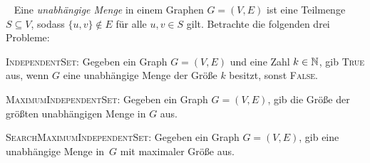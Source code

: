 \documentclass{uebung_cs}
\begin{document}
\begin{exercise}\
	Eine \emph{unabhängige Menge} in einem Graphen $G = (V,E)$ ist eine Teilmenge $S \subseteq V$, sodass $\{u,v\} \not\in E$ für alle $u,v \in S$ gilt. Betrachte die folgenden drei Probleme:

	\textsc{IndependentSet}: Gegeben ein Graph $G = (V,E)$ und eine Zahl $k \in \mathbb{N}$, gib \textsc{True} aus, wenn $G$ eine unabhängige Menge der Größe $k$ besitzt, sonst \textsc{False}.

	\textsc{MaximumIndependentSet}: Gegeben ein Graph $G = (V,E)$, gib die Größe der größten unabhängigen Menge in $G$ aus.

	\textsc{SearchMaximumIndependentSet}: Gegeben ein Graph $G = (V,E)$, gib eine unabhängige Menge in~$G$ mit maximaler Größe aus.


\end{exercise}
\end{document}
